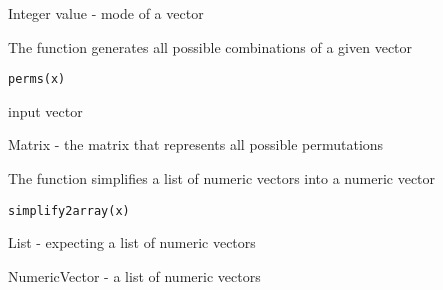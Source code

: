 \documentclass[a4paper]{book}
\begin{document}
%
\begin{Value}
Integer value - mode of a vector
\end{Value}
%
\begin{Description}\relax
The function generates all possible combinations of a given vector
\end{Description}
%
\begin{Usage}
\begin{verbatim}
perms(x)
\end{verbatim}
\end{Usage}
%
\begin{Arguments}
\begin{ldescription}
\item[\code{x}] input vector
\end{ldescription}
\end{Arguments}
%
\begin{Value}
Matrix - the matrix that represents all possible permutations
\end{Value}
%
\begin{Description}\relax
The function simplifies a list of numeric vectors into a numeric vector
\end{Description}
%
\begin{Usage}
\begin{verbatim}
simplify2array(x)
\end{verbatim}
\end{Usage}
%
\begin{Arguments}
\begin{ldescription}
\item[\code{x}] List - expecting a list of numeric vectors
\end{ldescription}
\end{Arguments}
%
\begin{Value}
NumericVector - a list of numeric vectors
\end{Value}
\printindex{}
\end{document}
